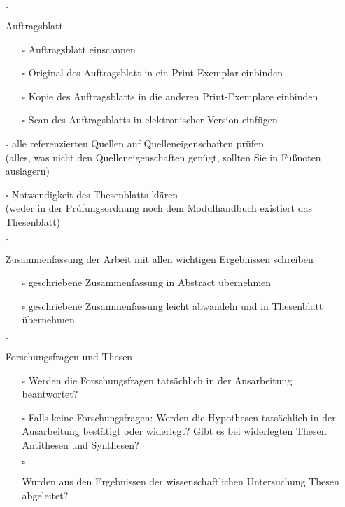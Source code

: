 \begin{itemize}
{\begin{itemize}
        \end{itemize}
    }
    \item[$\square$]{
        Auftragsblatt
        \begin{itemize}
            \item[$\square$] Auftragsblatt einscannen
            \item[$\square$] Original des Auftragsblatt in ein Print-Exemplar einbinden
            \item[$\square$] Kopie des Auftragsblatts in die anderen Print-Exemplare einbinden
            \item[$\square$] Scan des Auftragsblatts in elektronischer Version einfügen
        \end{itemize}
    }
    \item[$\square$]{
        alle referenzierten Quellen auf Quelleneigenschaften prüfen\\
        (alles, was nicht den Quelleneigenschaften genügt, sollten Sie in Fußnoten auslagern)
    }
    \item[$\square$]{
       Notwendigkeit des Thesenblatts klären\\
       (weder in der Prüfungsordnung noch dem Modulhandbuch existiert das Thesenblatt)
    }
    \item[$\square$]{
        Zusammenfassung der Arbeit mit allen wichtigen Ergebnissen schreiben
        \begin{itemize}
            \item[$\square$] geschriebene Zusammenfassung in Abstract übernehmen
            \item[$\square$] geschriebene Zusammenfassung leicht abwandeln und in Thesenblatt übernehmen
        \end{itemize}
    }
    \item[$\square$]{
        Forschungsfragen und Thesen
        \begin{itemize}
            \item[$\square$] Werden die Forschungsfragen tatsächlich in der Ausarbeitung beantwortet?
            \item[$\square$] Falls keine Forschungsfragen: Werden die Hypothesen tatsächlich in der Ausarbeitung bestätigt oder widerlegt? Gibt es bei widerlegten Thesen Antithesen und Synthesen?
            \item[$\square$]{
                Wurden aus den Ergebnissen der wissenschaftlichen Untersuchung Thesen abgeleitet?
                \begin{itemize}

\end{itemize}}
\end{itemize}}
\end{itemize}

